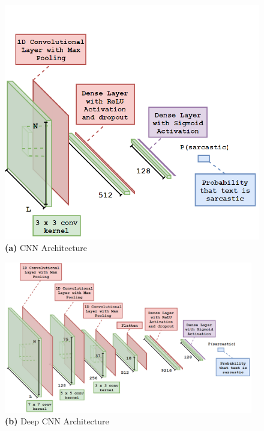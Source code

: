 \documentclass[12pt,a4paper]{article}
\begin{document}
\hspace{-20pt}\begin{minipage}{0.4\textwidth}
	\begin{figure}[H]
		\includegraphics[width=1\textwidth]{Images/CNNarchNew.png}
		\centering\textbf{(a)} CNN Architecture\\
	\end{figure}
\end{minipage}
\hspace{10pt}
\begin{minipage}{0.6\textwidth}
\begin{figure}[H]
	\includegraphics[width=0.97\textwidth]{Images/DCNNarchNew.png}
	\centering\textbf{(b)} Deep CNN Architecture\\
\end{figure}
\end{minipage}
\end{document}
